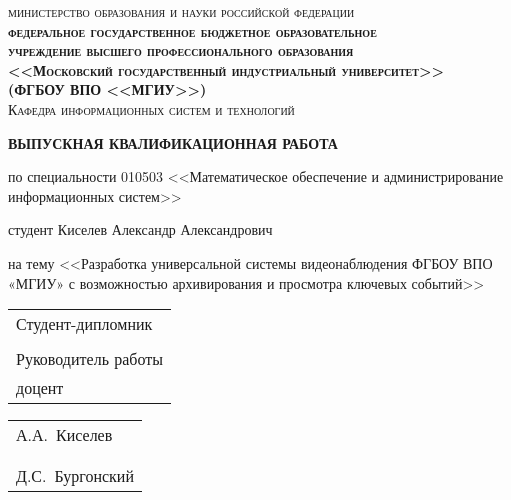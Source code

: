 \documentclass[a4paper,12pt,oneside]{memoir}
\begin{document}
\mainmatter
\noindent
\thispagestyle{empty}

\vspace*{-\headheight}\vspace*{-\headsep}

\begin{center}
\textsc{
министерство образования и науки российской федерации\\
\textbf{\small{федеральное государственное бюджетное образовательное\\
учреждение высшего профессионального образования\\
<<Московский государственный индустриальный университет>>}\\
(ФГБОУ ВПО <<МГИУ>>)}\\
Кафедра информационных систем и технологий\\
}

\vspace{3cm plus 1mm minus 1mm}


{\LARGE\textbf{ВЫПУСКНАЯ КВАЛИФИКАЦИОННАЯ РАБОТА}}

\vspace{1cm plus 1mm minus 1mm}

{\large
по специальности 010503 <<Математическое обеспечение и администрирование информационных систем>>

\vspace{1cm plus 1mm minus 1mm}

студент Киселев Александр Александрович

\vspace{1cm plus 1mm minus 1mm}

на тему <<Разработка универсальной системы видеонаблюдения ФГБОУ ВПО «МГИУ» с возможностью архивирования и просмотра ключевых событий>>\\

\vfill
\vspace{2cm plus 1mm minus 1mm}

\begin{tabular}{l}
Студент-дипломник\\
\\
Руководитель работы\\
доцент\\
\end{tabular}
\hfill
\begin{tabular}{l}
А.\+А.~Киселев\\
\\
\\
Д.\+С.~Бургонский\\
\end{tabular}

}
\end{center}
\end{document}
